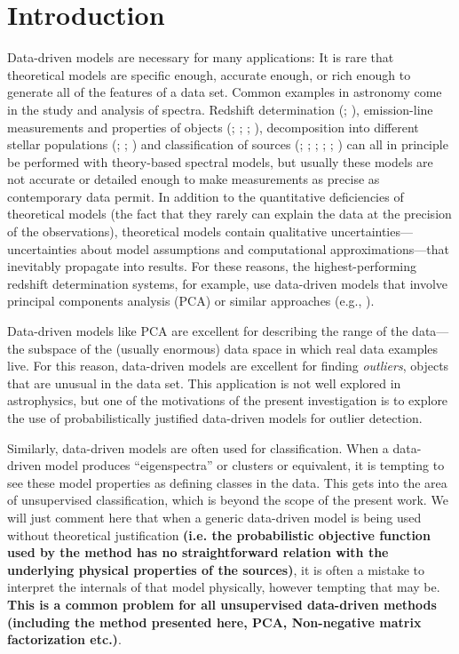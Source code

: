 \documentclass[12pt,preprint]{aastex}
\begin{document}
\section{Introduction}\label{sec:introduction}
Data-driven models are necessary for many applications: It is rare
that theoretical models are specific enough, accurate enough, or rich
enough to generate all of the features of a data set.  Common examples 
in astronomy come in the study and analysis of spectra.  Redshift
determination (\citealt{budavari}; \citealt{glazebrook}),
emission-line measurements and properties of objects (\citealt{allen}; 
\citealt{borosona}; \citealt{borosonc}; \citealt{wild}), 
decomposition into different stellar populations (\citealt{chen}; 
\citealt{ferreras}; \citealt{nolan}) and
classification of sources (\citealt{borosona}; \citealt{connolly};
\citealt{francis}; \citealt{suzuki}; \citealt{yip}; \citealt{yipb}) can all in
principle be performed with theory-based spectral models, but usually these 
models are not accurate or detailed enough to make
measurements as precise as contemporary data permit.  In addition to
the quantitative deficiencies of theoretical models (the fact that
they rarely can explain the data at the precision of the
observations), theoretical models contain qualitative
uncertainties---uncertainties about model assumptions and
computational approximations---that inevitably propagate into results.
For these reasons, the highest-performing redshift determination
systems, for example, use data-driven models that involve principal
components analysis (PCA) or similar approaches (e.g., \citealt{sdssdr7}).

Data-driven models like PCA are excellent for describing the range of
the data---the subspace of the (usually enormous) data space in which
real data examples live.  For this reason, data-driven models are
excellent for finding \emph{outliers}, objects that are unusual in the
data set.  This application is not well explored in astrophysics,
but one of the motivations of the present investigation is to explore
the use of probabilistically justified data-driven models for outlier
detection.

Similarly, data-driven models are often used for classification.  When
a data-driven model produces ``eigenspectra'' or clusters or
equivalent, it is tempting to see these model properties as defining
classes in the data.  This gets into the area of unsupervised
classification, which is beyond the scope of the present work.
We will just comment here that when a
generic data-driven model is being used without theoretical
justification \textbf{(i.e. the probabilistic objective function used by the 
method has no straightforward relation with the underlying physical properties 
of the sources)}, it is often a mistake to interpret the internals of
that model physically, however tempting that may be. \textbf{This is a 
common problem for all unsupervised data-driven methods (including the 
method presented here, PCA, Non-negative matrix factorization etc.)}.
\end{document}
